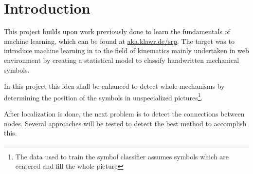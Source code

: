 
\section{Introduction}

This project builds upon work previously done to learn the fundamentals of machine learning, which can be found at \url{aka.klawr.de/srp}.
The target was to introduce machine learning in to the field of kinematics mainly undertaken in web environment by creating a statistical model to classify handwritten mechanical symbols.

In this project this idea shall be enhanced to detect whole mechanisms by determining the position of the symbols in unspecialized pictures\footnote{The data used to train the symbol classifier assumes symbols which are centered and fill the whole picture}.

After localization is done, the next problem is to detect the connections between nodes.
Several approaches will be tested to detect the best method to accomplish this.
